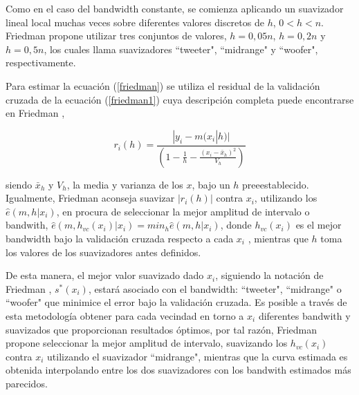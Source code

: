 \hspace*{0.4 cm} Como en el caso del bandwidth constante, se comienza aplicando un suavizador lineal local muchas veces sobre diferentes valores discretos de $h$, $0 < h < n$. Friedman \cite{F} propone utilizar tres conjuntos de valores, $h=0,05n$, $h=0,2n$ y $h=0,5n$, los cuales llama suavizadores ``tweeter", ``midrange" y ``woofer", respectivamente.

\hspace*{0.4 cm} Para estimar la ecuaci\'on (\ref{friedman}) se utiliza el residual de la validaci\'on cruzada de la ecuaci\'on (\ref{friedman1}) cuya descripci\'on completa puede encontrarse en Friedman \cite{F},

\vspace*{0.2 cm}

\begin{equation}
 r_{i}(h)= \frac{|y_{i}-m(x_{i}|h)|}{\left(1-\frac{1}{h}-\frac{(x_{i}-\bar{x}_{h})^2}{V_{h}}\right)}  
 \label{friedman1}
\end{equation}

\vspace*{0.2 cm}

\noindent siendo $\bar{x}_{h}$ y $V_{h}$, la media y varianza de los $x$, bajo un $h$ preeestablecido. Igualmente, Friedman \cite{F} aconseja suavizar $|r_{i}(h)|$ contra $x_{i}$, utilizando los $\hat{e}(m, h|x_{i})$, en procura de seleccionar la mejor amplitud de intervalo o bandwith, $\hat{e}(m, h_{vc}(x_{i})|x_{i})=min_{h} \hat{e}(m, h|x_{i})$, donde $h_{vc} (x_{i})$ es el mejor bandwidth bajo la validaci\'on cruzada respecto a cada $x_{i}$ , mientras que $h$ toma los valores de los suavizadores antes definidos.

\hspace*{0.4 cm} De esta manera, el mejor valor suavizado dado $x_{i}$, siguiendo la notaci\'on de Friedman \cite{F}, $s^{*}(x_{i})$, estar\'a asociado con el bandwidth: ``tweeter", ``midrange" \hspace*{0.01 cm} o ``woofer" que minimice el error bajo la validaci\'on cruzada. Es posible a trav\'es de esta metodolog\'ia obtener para cada vecindad en torno a $x_{i}$ diferentes bandwith y suavizados que proporcionan resultados \'optimos, por tal raz\'on, Friedman \cite{F} propone seleccionar la mejor amplitud de intervalo, suavizando los $h_{vc} (x_{i})$ contra $x_{i}$ utilizando el suavizador ``midrange", mientras que la curva estimada es obtenida interpolando entre los dos suavizadores con los bandwith estimados m\'as parecidos.


